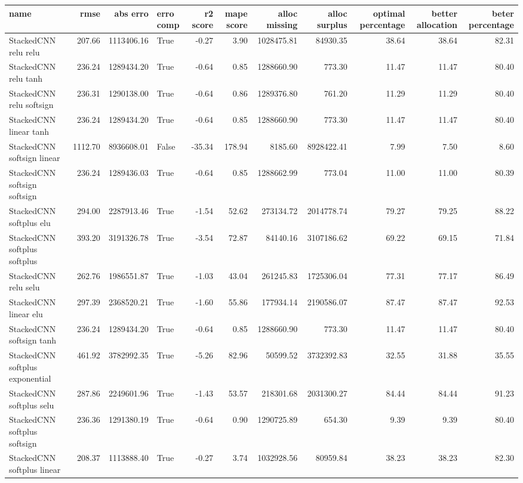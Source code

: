 \begin{tabular}{lrrlrrrrrrr}
\toprule
name & rmse & abs erro & erro comp & r2 score & mape score & alloc missing & alloc surplus & optimal percentage & better allocation & beter percentage \\
\midrule
StackedCNN relu relu & 207.66 & 1113406.16 & True & -0.27 & 3.90 & 1028475.81 & 84930.35 & 38.64 & 38.64 & 82.31 \\
StackedCNN relu tanh & 236.24 & 1289434.20 & True & -0.64 & 0.85 & 1288660.90 & 773.30 & 11.47 & 11.47 & 80.40 \\
StackedCNN relu softsign & 236.31 & 1290138.00 & True & -0.64 & 0.86 & 1289376.80 & 761.20 & 11.29 & 11.29 & 80.40 \\
StackedCNN linear tanh & 236.24 & 1289434.20 & True & -0.64 & 0.85 & 1288660.90 & 773.30 & 11.47 & 11.47 & 80.40 \\
StackedCNN softsign linear & 1112.70 & 8936608.01 & False & -35.34 & 178.94 & 8185.60 & 8928422.41 & 7.99 & 7.50 & 8.60 \\
StackedCNN softsign softsign & 236.24 & 1289436.03 & True & -0.64 & 0.85 & 1288662.99 & 773.04 & 11.00 & 11.00 & 80.39 \\
StackedCNN softplus elu & 294.00 & 2287913.46 & True & -1.54 & 52.62 & 273134.72 & 2014778.74 & 79.27 & 79.25 & 88.22 \\
StackedCNN softplus softplus & 393.20 & 3191326.78 & True & -3.54 & 72.87 & 84140.16 & 3107186.62 & 69.22 & 69.15 & 71.84 \\
StackedCNN relu selu & 262.76 & 1986551.87 & True & -1.03 & 43.04 & 261245.83 & 1725306.04 & 77.31 & 77.17 & 86.49 \\
StackedCNN linear elu & 297.39 & 2368520.21 & True & -1.60 & 55.86 & 177934.14 & 2190586.07 & 87.47 & 87.47 & 92.53 \\
StackedCNN softsign tanh & 236.24 & 1289434.20 & True & -0.64 & 0.85 & 1288660.90 & 773.30 & 11.47 & 11.47 & 80.40 \\
StackedCNN softplus exponential & 461.92 & 3782992.35 & True & -5.26 & 82.96 & 50599.52 & 3732392.83 & 32.55 & 31.88 & 35.55 \\
StackedCNN softplus selu & 287.86 & 2249601.96 & True & -1.43 & 53.57 & 218301.68 & 2031300.27 & 84.44 & 84.44 & 91.23 \\
StackedCNN softplus softsign & 236.36 & 1291380.19 & True & -0.64 & 0.90 & 1290725.89 & 654.30 & 9.39 & 9.39 & 80.40 \\
StackedCNN softplus linear & 208.37 & 1113888.40 & True & -0.27 & 3.74 & 1032928.56 & 80959.84 & 38.23 & 38.23 & 82.30 \\

\end{tabular}
